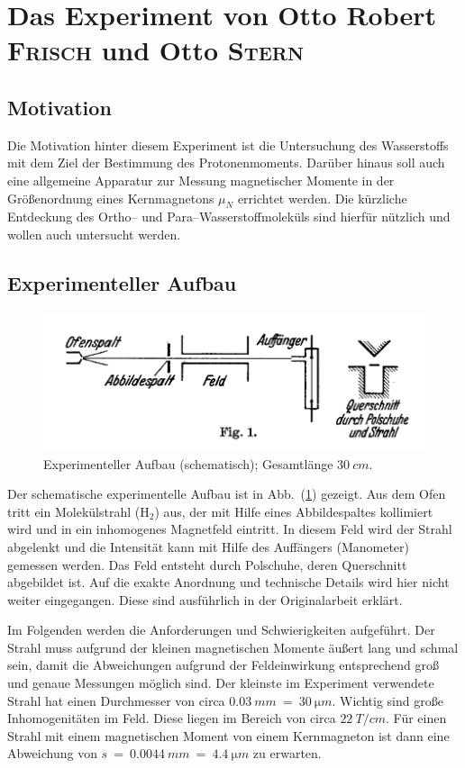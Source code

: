 \documentclass[sn-mathphys-num,iicol]{sn-jnl}
\theoremstyle{thmstyleone}
\theoremstyle{thmstyletwo}
\theoremstyle{thmstylethree}
\begin{document}
\section{Das Experiment von Otto Robert \textsc{Frisch} und Otto \textsc{Stern}}
\subsection{Motivation}
Die Motivation hinter diesem Experiment ist die Untersuchung des Wasserstoffs mit dem Ziel der Bestimmung des Protonenmoments.
Darüber hinaus soll auch eine allgemeine Apparatur zur Messung magnetischer Momente in der Größenordnung eines Kernmagnetons $\mu _N$ errichtet werden.
Die kürzliche Entdeckung des Ortho-- und Para--Wasserstoffmoleküls sind hierfür nützlich und wollen auch untersucht werden.

\subsection{Experimenteller Aufbau}
\begin{figure}[h]
        \includegraphics[width=.5\textwidth]{../vortrag/prosi_versuchsaufbau_mag_moment.png}
        \caption{Experimenteller Aufbau (schematisch); Gesamtlänge $\SI{30}{cm}$.\cite{FrischStern1933}}\label{fig:experimenteller_aufbau_frisch_stern}
\end{figure}
\noindent Der schematische experimentelle Aufbau ist in Abb.\ (\ref{fig:experimenteller_aufbau_frisch_stern}) gezeigt.
Aus dem Ofen tritt ein Molekülstrahl ($\text{H}_2$) aus, der mit Hilfe eines Abbildespaltes kollimiert wird und in ein inhomogenes Magnetfeld eintritt.
In diesem Feld wird der Strahl abgelenkt und die Intensität kann mit Hilfe des Auffängers (Manometer) gemessen werden.
Das Feld entsteht durch Polschuhe, deren Querschnitt abgebildet ist.
Auf die exakte Anordnung und technische Details wird hier nicht weiter eingegangen.
Diese sind ausführlich in der Originalarbeit\cite{FrischStern1933} erklärt.

Im Folgenden werden die Anforderungen und Schwierigkeiten aufgeführt.
Der Strahl muss aufgrund der kleinen magnetischen Momente äußert lang und schmal sein, damit die Abweichungen aufgrund der Feldeinwirkung entsprechend groß und genaue Messungen möglich sind.
Der kleinste im Experiment verwendete Strahl hat einen Durchmesser von circa $\SI{0.03}{mm}~=~\SI{30}{\micro m}$.
Wichtig sind große Inhomogenitäten im Feld.
Diese liegen im Bereich von circa $\SI{22}{T/cm}$.
Für einen Strahl mit einem magnetischen Moment von einem Kernmagneton ist dann eine Abweichung von $s~=~\SI{0.0044}{mm}~=~\SI{4.4}{\micro m}$ zu erwarten.
\end{document}
